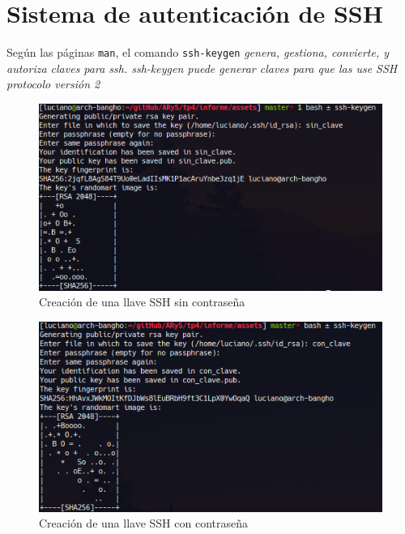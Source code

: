 







\clearpage
\tableofcontents
\clearpage 

\lstset{style=bashstyle}

\section{Sistema de autenticación de SSH}

Según las páginas \texttt{man}, el comando \texttt{ssh-keygen} \emph{genera, gestiona, convierte, y autoriza claves para ssh. ssh-keygen puede generar claves para que las use SSH protocolo versión 2} 

\begin{figure}[H]
    \centering
    \includegraphics[scale=0.6]{images/ssh-sin-clave.png}
    \caption*{Creación de una llave SSH sin contraseña}
\end{figure}

\begin{figure}[H]
    \centering
    \includegraphics[scale=0.6]{images/ssh-con-clave.png}
    \caption*{Creación de una llave SSH con contraseña }
\end{figure}

